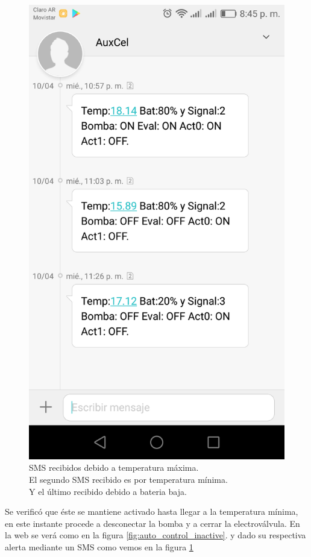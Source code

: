 \begin{figure}[h]
  \centering
  \includegraphics[scale=.15]{./Figures/sms_min_max_bat.png}
  \caption{SMS recibidos debido a temperatura máxima. \\
   El segundo SMS recibido es por temperatura mínima. \\
   Y el último recibido debido a bateria baja.}
  \label{fig:sms_min_max_bat}
\end{figure}

Se verificó que éste se mantiene activado hasta llegar a la temperatura mínima, en este instante procede a desconectar la bomba y a cerrar la electroválvula. En la web se verá como en la figura \ref{fig:auto_control_inactive}. y dado su respectiva alerta mediante un SMS como vemos en la figura \ref{fig:sms_min_max_bat}

